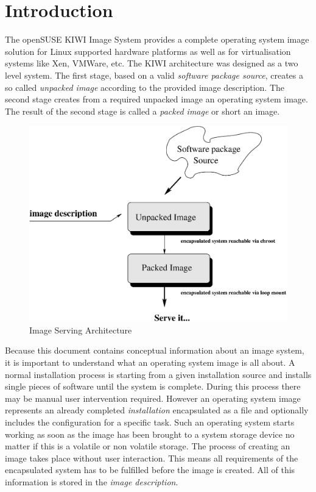 \chapter{Introduction}

The openSUSE KIWI Image System provides a complete operating system
image solution for Linux supported hardware platforms as well as
for virtualisation systems like Xen, VMWare, etc. The KIWI architecture
was designed as a two level system. The first stage, based on a valid
\emph{software package source}, creates a so called \emph{unpacked image}
according to the provided image description. The second stage creates from
a required unpacked image an operating system image. The result of the
second stage is called a \emph{packed image} or short an image.

\begin{figure}[h]
\centering
\includegraphics[scale=0.5]{pictures/intro.eps}
\caption{Image Serving Architecture}
\label{fig:architecture}
\end{figure}

Because this document contains conceptual information about an image system,
it is important to understand what an operating system image is all about.
A normal installation process is starting from a given installation source
and installs single pieces of software until the system is complete. During
this process there may be manual user intervention required. However an
operating system image represents an already completed \emph{installation}
encapsulated as a file and optionally includes the configuration for a
specific task. Such an operating system starts working as soon as the
image has been brought to a system storage device no matter if this is a
volatile or non volatile storage. The process of creating an image takes
place without user interaction.
This means all requirements of the encapsulated system has to be fulfilled
before the image is created. All of this information is stored in the
\emph{image description}.

